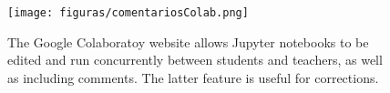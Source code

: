 \begin{figure}[!ht]
	\centering
	\texttt{[image: figuras/comentariosColab.png]}
	\caption{
		The Google Colaboratoy website allows Jupyter notebooks to be edited and run concurrently between students and teachers, as well as including comments.
		The latter feature is useful for corrections.
	}
	\label{fig:colab}
\end{figure}